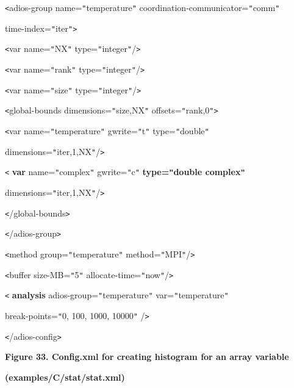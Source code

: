 \texttt{<}adios-group name=\texttt{"}temperature\texttt{"} coordination-communicator=\texttt{"}comm\texttt{"} 

\leftskip=36pt
\parindent=36pt
time-index=\texttt{"}iter\texttt{"}\texttt{>}

\leftskip=0pt
\parindent=0pt
\texttt{<}var name=\texttt{"}NX\texttt{"} type=\texttt{"}integer\texttt{"}/\texttt{>}

\texttt{<}var name=\texttt{"}rank\texttt{"} type=\texttt{"}integer\texttt{"}/\texttt{>}

\texttt{<}var name=\texttt{"}size\texttt{"} type=\texttt{"}integer\texttt{"}/\texttt{>}

\texttt{<}global-bounds dimensions=\texttt{"}size,NX\texttt{"} offsets=\texttt{"}rank,0\texttt{"}\texttt{>}

\texttt{<}var name=\texttt{"}temperature\texttt{"} gwrite=\texttt{"}t\texttt{"} 
type=\texttt{"}double\texttt{"}

dimensions=\texttt{"}iter,1,NX\texttt{"}/\texttt{>}

\parindent=36pt
{\color{color02} \texttt{<}}{\color{color02} \textbf{var}}{\color{color02}  name=\texttt{"}complex\texttt{"} 
gwrite=\texttt{"}c\texttt{"} }{\color{color02} \textbf{type=\texttt{"}double complex\texttt{"}}}

\parindent=0pt
{\color{color02} dimensions=\texttt{"}iter,1,NX\texttt{"}/\texttt{>}}

\texttt{<}/global-bounds\texttt{>}

\parindent=36pt
\texttt{<}/adios-group\texttt{>}

\parindent=0pt
\texttt{<}method group=\texttt{"}temperature\texttt{"} method=\texttt{"}MPI\texttt{"}/\texttt{>}

\texttt{<}buffer size-MB=\texttt{"}5\texttt{"} allocate-time=\texttt{"}now\texttt{"}/\texttt{>}

{\color{color02} \texttt{<}}{\color{color02} \textbf{analysis}}{\color{color02}  
adios-group=\texttt{"}temperature\texttt{"} var=\texttt{"}temperature\texttt{"}}

{\color{color02} break-points=\texttt{"}0, 100, 1000, 10000\texttt{"} /\texttt{>}}

\texttt{<}/adios-config\texttt{>}

\label{HToc144350192}

\begin{center}
{\color{color20} \textbf{Figure 33. Config.xml for creating histogram for an array 
variable}}

{\color{color20} \textbf{(examples/C/stat/stat.xml)}}
\end{center}


